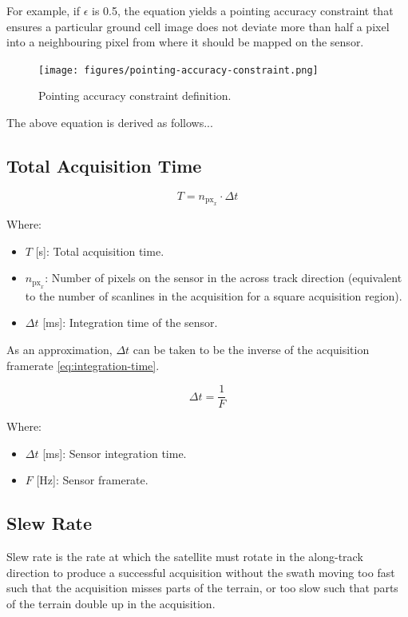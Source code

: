 \documentclass{article}
\begin{document}
For example, if $\epsilon$ is 0.5, the equation yields a pointing accuracy constraint that ensures a particular ground cell image does not deviate more than half a pixel into a neighbouring pixel from where it should be mapped on the sensor.

\begin{figure}[H]
\centering
\texttt{[image: figures/pointing-accuracy-constraint.png]}
\caption{Pointing accuracy constraint definition.}
\label{fig:pointing-accuracy-constraint}
\end{figure}

The above equation is derived as follows...

\subsection{Total Acquisition Time}

\begin{equation}
    T = n_{\text{px}_x} \cdot \Delta t
\end{equation}

Where:
\begin{itemize}[label={}]
    \item $T$ [\si{s}]: Total acquisition time.
    \item $n_{\text{px}_x}$: Number of pixels on the sensor in the across track direction (equivalent to the number of scanlines in the acquisition for a square acquisition region).
    \item $\Delta t$ [\si{\ms}]: Integration time of the sensor.
\end{itemize}

As an approximation, $\Delta t$ can be taken to be the inverse of the acquisition framerate \eqref{eq:integration-time}. 

\begin{equation} \label{eq:integration-time}
    \Delta t = \frac{1}{F}
\end{equation}

Where:
\begin{itemize}[label={}]
    \item $\Delta t$ [\si{\ms}]: Sensor integration time.
    \item $F$ [\si{\hertz}]: Sensor framerate.
\end{itemize}

\subsection{Slew Rate}
Slew rate is the rate at which the satellite must rotate in the along-track direction to produce a successful acquisition without the swath moving too fast such that the acquisition misses parts of the terrain, or too slow such that parts of the terrain double up in the acquisition.
\end{document}
